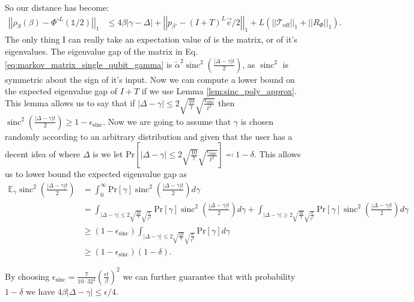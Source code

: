 \documentclass{article}
\newcommand{\off}{\text{off}}
\newcommand{\parens}[1]{\left( #1 \right)}
\newcommand{\abs}[1]{\left| #1 \right|}
\newcommand{\norm}[1]{\left| \left| #1 \right| \right|}
\newcommand{\prob}[1]{\text{Pr}\left[ #1 \right]}
\newcommand{\identity}{\mathds{1}}
\DeclareMathOperator{\sinc}{sinc}
\begin{document}
So our distance has become:
\begin{align}
    \norm{\rho_S(\beta) - \Phi^{\circ L}(\identity / 2)}_1 &\le 4 \beta \abs{\gamma - \Delta} + \norm{p_{\beta'} - (I + T)^L \vec{e} / 2}_1 + L (\norm{\mathcal{T}_{\off}}_1 + \norm{R_{\Phi}}_1).
\end{align}
The only thing I can really take an expectation value of is the matrix, or of it's eigenvalues. The eigenvalue gap of the matrix in Eq. \eqref{eq:markov_matrix_single_qubit_gamma} is $\widetilde{\alpha}^2 \sinc^2 \left( \frac{|\Delta - \gamma| t}{2} \right)$, as $\sinc^2$ is symmetric about the sign of it's input. Now we can compute a lower bound on the expected eigenvalue gap of $I + T$ if we use Lemma \ref{lem:sinc_poly_approx}. This lemma allows us to say that if $|\Delta - \gamma| \leq 2\sqrt{\frac{10}{7}} \sqrt{\frac{\epsilon_{\sinc}}{t^2}}$ then $\sinc^2 \left( \frac{|\Delta - \gamma| t}{2} \right) \ge 1 - \epsilon_{\sinc}$.  Now we are going to assume that $\gamma$ is chosen randomly according to an arbitrary distribution and given that the user has a decent idea of where $\Delta$ is we let $\prob{|\Delta - \gamma| \le  2\sqrt{\frac{10}{7}} \sqrt{\frac{\epsilon_{\sinc}}{t^2}}} \eqqcolon 1-\delta$. This allows us to lower bound the expected eigenvalue gap as
\begin{align}
    \mathbb{E}_{\gamma} \sinc^2 \left( \frac{|\Delta - \gamma| t}{2}\right) &= \int_0^{\infty} \prob{\gamma} \sinc^2 \left( \frac{|\Delta - \gamma| t}{2}\right) d\gamma \\
    &= \int_{|\Delta - \gamma| \le  2\sqrt{\frac{10}{7}} \sqrt{\frac{\epsilon}{t^2}}} \prob{\gamma} \sinc^2 \left( \frac{|\Delta - \gamma| t}{2}\right) d\gamma + \int_{|\Delta - \gamma| \ge 2\sqrt{\frac{10}{7}} \sqrt{\frac{\epsilon}{t^2}}} \prob{\gamma} \sinc^2 \left( \frac{|\Delta - \gamma| t}{2}\right) d\gamma \\
    &\geq (1 - \epsilon_{\sinc}) \int_{|\Delta - \gamma| \le  2\sqrt{\frac{10}{7}} \sqrt{\frac{\epsilon}{t^2}}} \prob{\gamma} d\gamma \\
    &\ge (1 - \epsilon_{\sinc}) (1 - \delta).
\end{align}

By choosing $\epsilon_{\sinc} = \frac{7}{10 \cdot 32^2} \parens{\frac{\epsilon t}{\beta}}^2$ we can further guarantee that with probability $1 - \delta$ we have $4 \beta |\Delta - \gamma| \le \epsilon / 4$.
\end{document}
